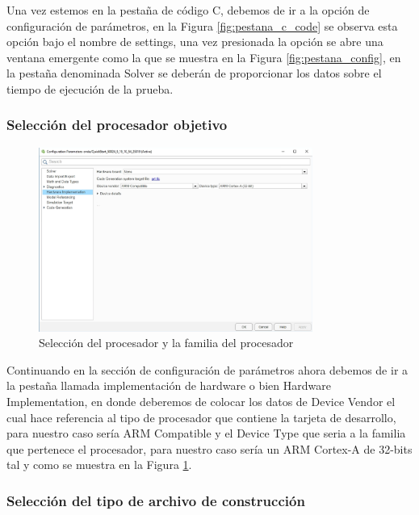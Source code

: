 Una vez estemos en la pestaña de código C, debemos de ir a la opción de configuración de parámetros, en la Figura \ref{fig:pestana_c_code} se observa esta opción bajo el nombre de settings, una vez presionada la opción se abre una ventana emergente como la que se muestra en la Figura \ref{fig:pestana_config}, en la pestaña denominada Solver se deberán de proporcionar los datos sobre el tiempo de ejecución de la prueba.

\subsubsection{Selección del procesador objetivo}

\begin{figure}[h!]
    \centering
    \includegraphics[width=0.8\textwidth]{fig/especifico_2/M2MT/paso_a_paso_mtmt/configuration_parameters_processor.png}
    \caption{Selección del procesador y la familia del procesador}
    \label{fig:pestana_config_procesador}
\end{figure}

Continuando en la sección de configuración de parámetros ahora debemos de ir a la pestaña llamada implementación de hardware o bien Hardware Implementation, en donde deberemos de colocar los datos de Device Vendor el cual hace referencia al tipo de procesador que contiene la tarjeta de desarrollo, para nuestro caso sería ARM Compatible y el Device Type que seria a la familia que pertenece el procesador, para nuestro caso sería un ARM Cortex-A de 32-bits tal y como se muestra en la Figura \ref{fig:pestana_config_procesador}.


\subsubsection{Selección del tipo de archivo de construcción}

